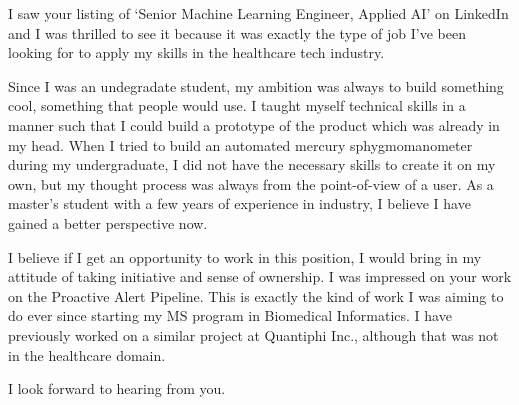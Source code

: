 I saw your listing of `Senior Machine Learning Engineer, Applied AI' on LinkedIn and I was thrilled to see it because it was exactly the type of job I've been looking for to apply my skills in the healthcare tech industry.

Since I was an undegradate student, my ambition was always to build something cool, something that people would use. I taught myself technical skills in a manner such that I could build a prototype of the product which was already in my head. When I tried to build an automated mercury sphygmomanometer during my undergraduate, I did not have the necessary skills to create it on my own, but my thought process was always from the point-of-view of a user. As a master's student with a few years of experience in industry, I believe I have gained a better perspective now.

I believe if I get an opportunity to work in this position, I would bring in my attitude of taking initiative and sense of ownership. I was impressed on your work on the Proactive Alert Pipeline. This is exactly the kind of work I was aiming to do ever since starting my MS program in Biomedical Informatics. I have previously worked on a similar project at Quantiphi Inc., although that was not in the healthcare domain. 

I look forward to hearing from you. 